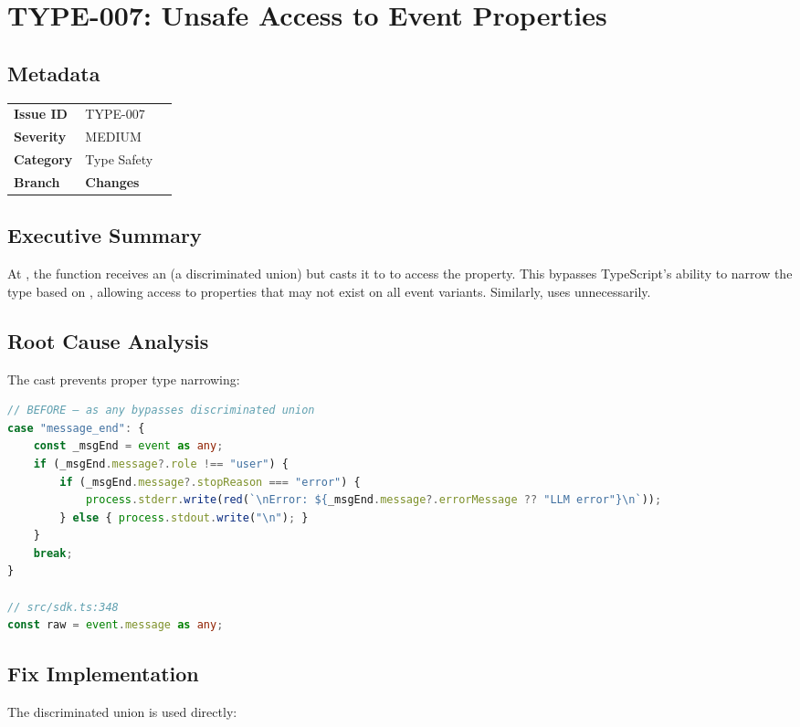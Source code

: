 \section{TYPE-007: Unsafe Access to Event Properties}
\label{sec:type-007}
\subsection*{Metadata}
\begin{tabular}{ll}
\textbf{Issue ID} & TYPE-007 \\
\textbf{Severity} & MEDIUM \\
\textbf{Category} & Type Safety \\
\textbf{Branch} & 
\textbf{Changes} &  \\
\end{tabular}

\subsection*{Executive Summary}
At , the  function receives an  (a discriminated union) but casts it to  to access the  property. This bypasses TypeScript's ability to narrow the type based on , allowing access to properties that may not exist on all event variants. Similarly,  uses  unnecessarily.

\subsection*{Root Cause Analysis}
The  cast prevents proper type narrowing:

\begin{lstlisting}[language=TypeScript]
// BEFORE — as any bypasses discriminated union
case "message_end": {
    const _msgEnd = event as any;
    if (_msgEnd.message?.role !== "user") {
        if (_msgEnd.message?.stopReason === "error") {
            process.stderr.write(red(`\nError: ${_msgEnd.message?.errorMessage ?? "LLM error"}\n`));
        } else { process.stdout.write("\n"); }
    }
    break;
}

// src/sdk.ts:348
const raw = event.message as any;
\end{lstlisting}

\subsection*{Fix Implementation}
The discriminated union is used directly:

